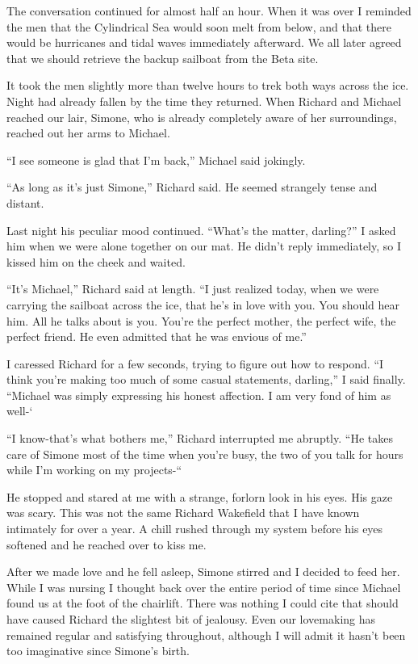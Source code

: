 \documentclass[]{article}
\begin{document}
The conversation continued for almost half an hour. When it was over I reminded the men that the Cylindrical Sea would soon melt from below, and that there would be hurricanes and tidal waves immediately afterward. We all later agreed that we should retrieve the backup sailboat from the Beta site.

It took the men slightly more than twelve hours to trek both ways across the ice. Night had already fallen by the time they returned. When Richard and Michael reached our lair, Simone, who is already completely aware of her surroundings, reached out her arms to Michael.

“I see someone is glad that I’m back,” Michael said jokingly.

“As long as it’s just Simone,” Richard said. He seemed strangely tense and distant.

Last night his peculiar mood continued. “What’s the matter, darling?” I asked him when we were alone together on our mat. He didn’t reply immediately, so I kissed him on the cheek and waited.

“It’s Michael,” Richard said at length. “I just realized today, when we were carrying the sailboat across the ice, that he’s in love with you. You should hear him. All he talks about is you. You’re the perfect mother, the perfect wife, the perfect friend. He even admitted that he was envious of me.”

I caressed Richard for a few seconds, trying to figure out how to respond. “I think you’re making too much of some casual statements, darling,” I said finally. “Michael was simply expressing his honest affection. I am very fond of him as well-‘

“I know-that’s what bothers me,” Richard interrupted me abruptly. “He takes care of Simone most of the time when you’re busy, the two of you talk for hours while I’m working on my projects-“

He stopped and stared at me with a strange, forlorn look in his eyes. His gaze was scary. This was not the same Richard Wakefield that I have known intimately for over a year. A chill rushed through my system before his eyes softened and he reached over to kiss me.

After we made love and he fell asleep, Simone stirred and I decided to feed her. While I was nursing I thought back over the entire period of time since Michael found us at the foot of the chairlift. There was nothing I could cite that should have caused Richard the slightest bit of jealousy. Even our lovemaking has remained regular and satisfying throughout, although I will admit it hasn’t been too imaginative since Simone’s birth.
\end{document}
